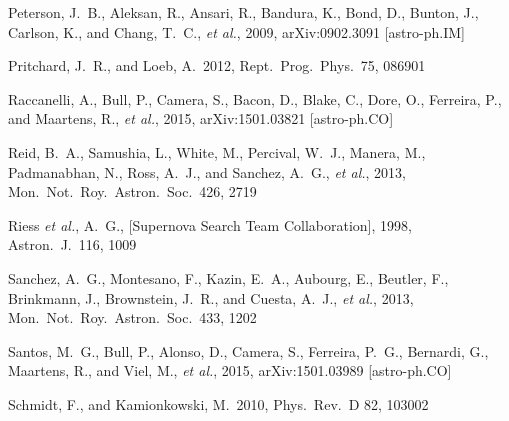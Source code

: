 \begin{thebibliography}{99}
\begin{multicols}{2}
{ 
  Peterson, J.~B., Aleksan, R., Ansari, R., Bandura, K., Bond, D., Bunton, J., Carlson, K., and Chang, T.~C., {\it et al.}, 2009,
  arXiv:0902.3091 [astro-ph.IM]
  

  Pritchard, J.~R., and Loeb, A.\ 2012,
  Rept.\ Prog.\ Phys.\ 75, 086901



  Raccanelli, A., Bull, P., Camera, S., Bacon, D., Blake, C., Dore, O., Ferreira, P., and Maartens, R., {\it et al.}, 2015,
  arXiv:1501.03821 [astro-ph.CO]

  Reid, B.~A., Samushia, L., White, M., Percival, W.~J., Manera, M., Padmanabhan, N., Ross, A.~J., and Sanchez, A.~G., {\it et al.}, 2013,
  Mon.\ Not.\ Roy.\ Astron.\ Soc.\ 426, 2719

  Riess {\it et al.}, A.~G.,  [Supernova Search Team Collaboration], 1998,
  Astron.\ J.\ 116, 1009


  Sanchez, A.~G., Montesano, F., Kazin, E.~A., Aubourg, E., Beutler, F., Brinkmann, J., Brownstein, J.~R., and Cuesta, A.~J., {\it et al.}, 2013,
  Mon.\ Not.\ Roy.\ Astron.\ Soc.\ 433, 1202

  Santos, M.~G., Bull, P., Alonso, D., Camera, S., Ferreira, P.~G., Bernardi, G., Maartens, R., and Viel, M., {\it et al.}, 2015,
  arXiv:1501.03989 [astro-ph.CO]

  Schmidt, F., and Kamionkowski, M.\ 2010,
  Phys.\ Rev.\ D 82, 103002

}
\end{multicols}
\end{thebibliography}
